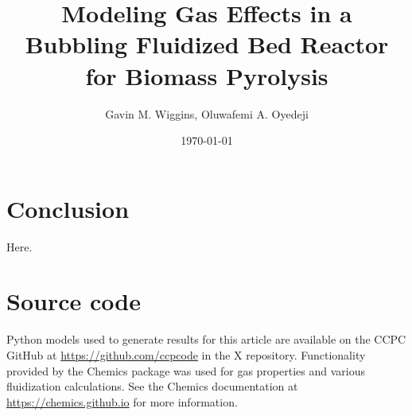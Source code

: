 \documentclass{article}
\title{Modeling Gas Effects in a Bubbling Fluidized Bed Reactor for Biomass Pyrolysis}
\author{Gavin M. Wiggins, Oluwafemi A. Oyedeji}
\date{\today}
\begin{document}
\maketitle
\tableofcontents








\section{Conclusion}

Here.

\section{Source code}

Python models used to generate results for this article are available on the CCPC GitHub at \url{https://github.com/ccpcode} in the X repository. Functionality provided by the Chemics package was used for gas properties and various fluidization calculations. See the Chemics documentation at \url{https://chemics.github.io} for more information.

\printbibliography
\end{document}
